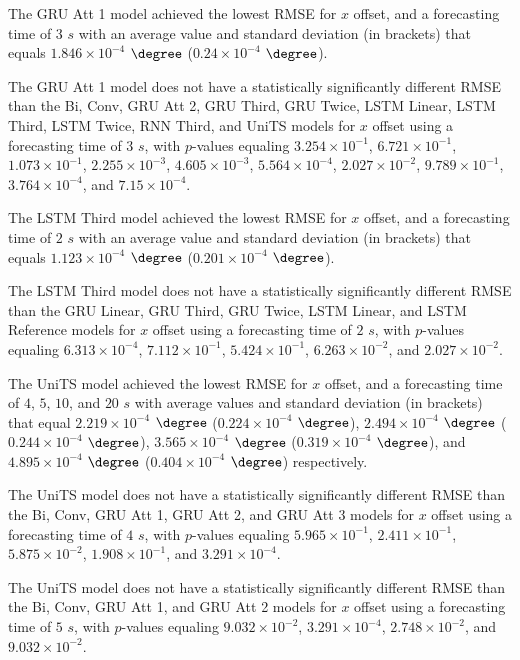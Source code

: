 The GRU Att 1 model achieved the lowest RMSE for $x$ offset, and a forecasting time of $3$ $s$ with an average value and standard deviation (in brackets) that equals $1.846 \times 10^{-4}$ $\degree$ ($0.24 \times 10^{-4}$ $\degree$).

The GRU Att 1 model does not have a statistically significantly different RMSE than the Bi, Conv, GRU Att 2, GRU Third, GRU Twice, LSTM Linear, LSTM Third, LSTM Twice, RNN Third, and UniTS models for $x$ offset using a forecasting time of $3$ $s$, with $p$-values equaling $3.254 \times 10^{-1}$, $6.721 \times 10^{-1}$, $1.073 \times 10^{-1}$, $2.255 \times 10^{-3}$, $4.605 \times 10^{-3}$, $5.564 \times 10^{-4}$, $2.027 \times 10^{-2}$, $9.789 \times 10^{-1}$, $3.764 \times 10^{-4}$, and $7.15 \times 10^{-4}$.

The LSTM Third model achieved the lowest RMSE for $x$ offset, and a forecasting time of $2$ $s$ with an average value and standard deviation (in brackets) that equals $1.123 \times 10^{-4}$ $\degree$ ($0.201 \times 10^{-4}$ $\degree$).

The LSTM Third model does not have a statistically significantly different RMSE than the GRU Linear, GRU Third, GRU Twice, LSTM Linear, and LSTM Reference models for $x$ offset using a forecasting time of $2$ $s$, with $p$-values equaling $6.313 \times 10^{-4}$, $7.112 \times 10^{-1}$, $5.424 \times 10^{-1}$, $6.263 \times 10^{-2}$, and $2.027 \times 10^{-2}$.

The UniTS model achieved the lowest RMSE for $x$ offset, and a forecasting time of $4$, $5$, $10$, and $20$ $s$ with average values and standard deviation (in brackets) that equal $2.219 \times 10^{-4}$ $\degree$ ($0.224 \times 10^{-4}$ $\degree$), $2.494 \times 10^{-4}$ $\degree$ ($0.244 \times 10^{-4}$ $\degree$), $3.565 \times 10^{-4}$ $\degree$ ($0.319 \times 10^{-4}$ $\degree$), and $4.895 \times 10^{-4}$ $\degree$ ($0.404 \times 10^{-4}$ $\degree$) respectively.

The UniTS model does not have a statistically significantly different RMSE than the Bi, Conv, GRU Att 1, GRU Att 2, and GRU Att 3 models for $x$ offset using a forecasting time of $4$ $s$, with $p$-values equaling $5.965 \times 10^{-1}$, $2.411 \times 10^{-1}$, $5.875 \times 10^{-2}$, $1.908 \times 10^{-1}$, and $3.291 \times 10^{-4}$.

The UniTS model does not have a statistically significantly different RMSE than the Bi, Conv, GRU Att 1, and GRU Att 2 models for $x$ offset using a forecasting time of $5$ $s$, with $p$-values equaling $9.032 \times 10^{-2}$, $3.291 \times 10^{-4}$, $2.748 \times 10^{-2}$, and $9.032 \times 10^{-2}$.

